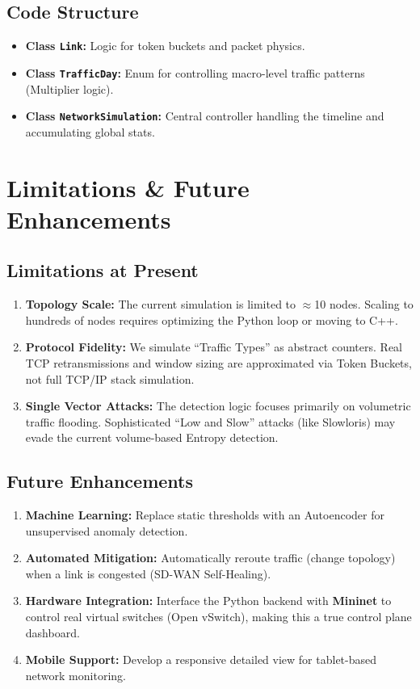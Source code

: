 \documentclass[12pt]{report}
\begin{document}
\section{Code Structure}
\begin{itemize}
    \item \textbf{Class \texttt{Link}:} Logic for token buckets and packet physics.
    \item \textbf{Class \texttt{TrafficDay}:} Enum for controlling macro-level traffic patterns (Multiplier logic).
    \item \textbf{Class \texttt{NetworkSimulation}:} Central controller handling the timeline and accumulating global stats.
\end{itemize}

\chapter{Limitations \& Future Enhancements}

\section{Limitations at Present}
\begin{enumerate}
    \item \textbf{Topology Scale:} The current simulation is limited to $\approx$10 nodes. Scaling to hundreds of nodes requires optimizing the Python loop or moving to C++.
    \item \textbf{Protocol Fidelity:} We simulate ``Traffic Types'' as abstract counters. Real TCP retransmissions and window sizing are approximated via Token Buckets, not full TCP/IP stack simulation.
    \item \textbf{Single Vector Attacks:} The detection logic focuses primarily on volumetric traffic flooding. Sophisticated ``Low and Slow'' attacks (like Slowloris) may evade the current volume-based Entropy detection.
\end{enumerate}

\section{Future Enhancements}
\begin{enumerate}
    \item \textbf{Machine Learning:} Replace static thresholds with an Autoencoder for unsupervised anomaly detection.
    \item \textbf{Automated Mitigation:} Automatically reroute traffic (change topology) when a link is congested (SD-WAN Self-Healing).
    \item \textbf{Hardware Integration:} Interface the Python backend with \textbf{Mininet} to control real virtual switches (Open vSwitch), making this a true control plane dashboard.
    \item \textbf{Mobile Support:} Develop a responsive detailed view for tablet-based network monitoring.
\end{enumerate}
\end{document}
